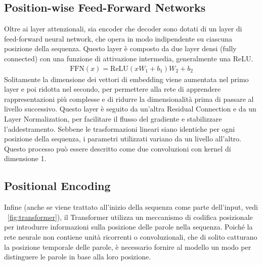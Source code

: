 \subsection{Position-wise Feed-Forward Networks}
Oltre ai layer attenzionali, sia encoder che decoder sono dotati di un layer di feed-forward neural network, che opera in modo indipendente su ciascuna posizione della sequenza. Questo layer è composto da due layer densi (fully connected) con una funzione di attivazione intermedia, generalmente una ReLU.
\begin{align}
	\text{FFN}(x) = \text{ReLU}(xW_1 + b_1)W_2 + b_2
\end{align}
Solitamente la dimensione dei vettori di embedding viene aumentata nel primo layer e poi ridotta nel secondo, per permettere alla rete di apprendere rappresentazioni più complesse e di ridurre la dimensionalità prima di passare al livello successivo. Questo layer è seguito da un'altra Residual Connection e da un Layer Normalization, per facilitare il flusso del gradiente e stabilizzare l'addestramento.
Sebbene le trasformazioni lineari siano identiche per ogni posizione della sequenza, i parametri utilizzati variano da un livello all'altro. Questo processo può essere descritto come due convoluzioni con kernel di dimensione 1.

\subsection{Positional Encoding}
\label{sec:positional-encoding}
Infine (anche se viene trattato all'inizio della sequenza come parte dell'input, vedi \figurename{~\ref{fig:transformer}}), il Transformer utilizza un meccanismo di codifica posizionale per introdurre informazioni sulla posizione delle parole nella sequenza. Poiché la rete neurale non contiene unità ricorrenti o convoluzionali, che di solito catturano la posizione temporale delle parole, è necessario fornire al modello un modo per distinguere le parole in base alla loro posizione.

